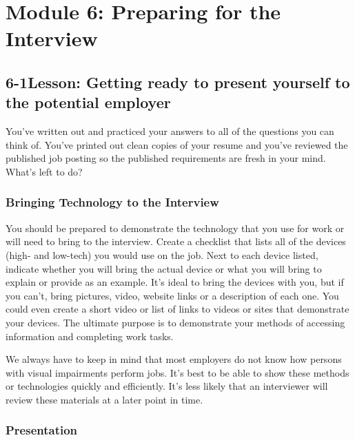 \pagebreak \section*{Module 6:	Preparing for the Interview}
\noindent\makebox[\textwidth]{\rule{\linewidth}{0.4pt}}  \localtableofcontents
\noindent\makebox[\textwidth]{\rule{\linewidth}{0.4pt}}


\pagebreak \subsection*{6-1\quad Lesson: Getting ready to present yourself to the potential employer}
You've written out and practiced your answers to all of the questions you can think of. You've printed out clean copies of your resume and you've reviewed the published job posting so the published requirements are fresh in your mind. What's left to do?

\subsubsection*{Bringing Technology to the Interview}
\break You should be prepared to demonstrate the technology that you use for work or will need to bring to the interview. Create a checklist that lists all of the devices (high- and low-tech) you would use on the job. Next to each device listed, indicate whether you will bring the actual device or what you will bring to explain or provide as an example. It's ideal to bring the devices with you, but if you can't, bring pictures, video, website links or a description of each one. You could even create a short video or list of links to videos or sites that demonstrate your devices. The ultimate purpose is to demonstrate your methods of accessing information and completing work tasks.

We always have to keep in mind that most employers do not know how persons with visual impairments perform jobs. It's best to be able to show these methods or technologies quickly and efficiently. It's less likely that an interviewer will review these materials at a later point in time.

\subsubsection*{Presentation}

